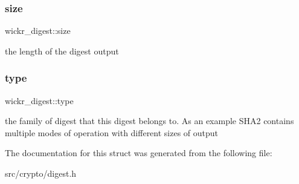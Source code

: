\subsubsection{\texorpdfstring{size}{size}}
{\footnotesize\ttfamily wickr\+\_\+digest\+::size}

the length of the digest output \mbox{\label{structwickr__digest_ae82f086c339d1e384518dfc4359d4522}} 
\subsubsection{\texorpdfstring{type}{type}}
{\footnotesize\ttfamily wickr\+\_\+digest\+::type}

the family of digest that this digest belongs to. As an example S\+H\+A2 contains multiple modes of operation with different sizes of output 

The documentation for this struct was generated from the following file\+:\begin{DoxyCompactItemize}
\item 
src/crypto/digest.\+h\end{DoxyCompactItemize}
